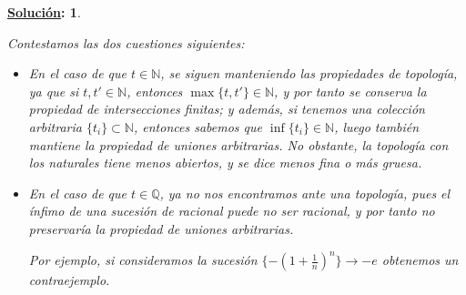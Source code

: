 \documentclass[10pt,a4paper,openright]{book}
\theoremstyle{break}
\newtheorem*{sol}{\underline{Solución}:}
\begin{document}
\begin{sol}
\begin{enumerate}[label={(\arabic*)}]
\end{enumerate}
Contestamos las dos cuestiones siguientes:
\begin{itemize}
\item En el caso de que $t \in \mathbb{N}$, se siguen manteniendo las propiedades de topología, ya que si $t,t' \in \mathbb{N}$, entonces $\max \{t,t'\} \in \mathbb{N}$, y por tanto se conserva la propiedad de intersecciones finitas; y además, si tenemos una colección arbitraria $\{t_i\} \subset \mathbb{N}$, entonces sabemos que $\inf \{t_i\} \in \mathbb{N}$, luego también mantiene la propiedad de uniones arbitrarias. No obstante, la topología con los naturales tiene menos abiertos, y se dice menos fina o más gruesa.
\item En el caso de que $t \in \mathbb{Q}$, ya no nos encontramos ante una topología, pues el ínfimo de una sucesión de racional puede no ser racional, y por tanto no preservaría la propiedad de uniones arbitrarias.

Por ejemplo, si consideramos la sucesión $\displaystyle \lbrace - \left(1 + \frac{1}{n} \right)^n \} \longrightarrow -e$ obtenemos un contraejemplo.
\end{itemize}
\end{sol}
\end{document}
